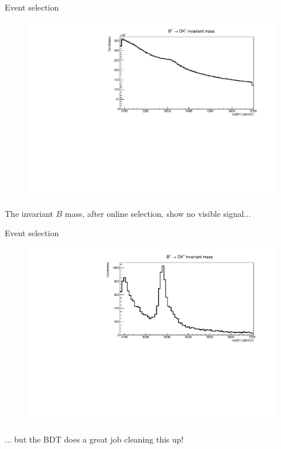 \documentclass{beamer}
\begin{document}
\begin{frame}{Event selection}
  \begin{figure}
    \centering
    \includegraphics[width = 1.0\textwidth]{Plots/BmassStripping.pdf}
  \end{figure}
  \begin{center}
    The invariant $B$ mass, after online selection, show no visible signal...
  \end{center}
\end{frame}

\begin{frame}{Event selection}
  \begin{figure}
    \centering
    \includegraphics[width = 1.0\textwidth]{Plots/BmassFinalSelection.pdf}
  \end{figure}
  \begin{center}
    ... but the BDT does a great job cleaning this up!
  \end{center}
\end{frame}
\end{document}
